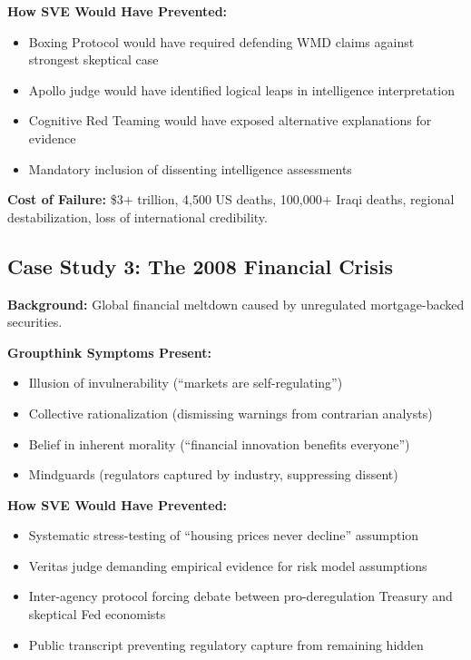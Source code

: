 \documentclass[11pt,a4paper]{article}
\begin{document}
\textbf{How SVE Would Have Prevented:}
\begin{itemize}[nosep]
    \item Boxing Protocol would have required defending WMD claims against strongest skeptical case
    \item Apollo judge would have identified logical leaps in intelligence interpretation
    \item Cognitive Red Teaming would have exposed alternative explanations for evidence
    \item Mandatory inclusion of dissenting intelligence assessments
\end{itemize}

\textbf{Cost of Failure:} \$3+ trillion, 4,500 US deaths, 100,000+ Iraqi deaths, regional destabilization, loss of international credibility.

\subsection*{Case Study 3: The 2008 Financial Crisis}

\textbf{Background:} Global financial meltdown caused by unregulated mortgage-backed securities.

\textbf{Groupthink Symptoms Present:}
\begin{itemize}[nosep]
    \item Illusion of invulnerability (``markets are self-regulating'')
    \item Collective rationalization (dismissing warnings from contrarian analysts)
    \item Belief in inherent morality (``financial innovation benefits everyone'')
    \item Mindguards (regulators captured by industry, suppressing dissent)
\end{itemize}

\textbf{How SVE Would Have Prevented:}
\begin{itemize}[nosep]
    \item Systematic stress-testing of ``housing prices never decline'' assumption
    \item Veritas judge demanding empirical evidence for risk model assumptions
    \item Inter-agency protocol forcing debate between pro-deregulation Treasury and skeptical Fed economists
    \item Public transcript preventing regulatory capture from remaining hidden
\end{itemize}
\end{document}
